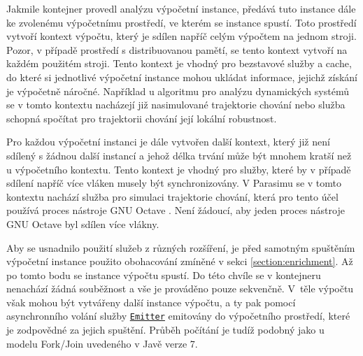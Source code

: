 Jakmile kontejner provedl analýzu výpočetní instance, předává tuto instance dále
ke zvolenému výpočetnímu prostředí, ve kterém se instance spustí. Toto prostředí
vytvoří kontext výpočtu, který je sdílen napříč celým výpočtem na
jednom stroji. Pozor, v případě prostředí s distribuovanou pamětí, se tento kontext
vytvoří na každém použitém stroji. Tento kontext je vhodný pro bezstavové služby
a cache, do které si jednotlivé výpočetní instance mohou ukládat informace, jejichž
získání je vý\-po\-čet\-ně náročné. Například u algoritmu pro analýzu dynamických systémů
se v tomto kontextu nacházejí již nasimulované trajektorie chování nebo služba schopná spočítat
pro trajektorii chování její lokální robustnost.

Pro každou výpočetní instanci je dále vytvořen další kontext, který již není sdílený
s žádnou další instancí a jehož délka trvání může být  mnohem kratší než u výpočetního kontextu.
Tento kontext je vhodný pro služby, které by v případě sdílení napříč více vláken musely
být synchronizovány. V Parasimu se v tomto kontextu nachází služba pro simulaci trajektorie
chování, která pro tento účel používá proces nástroje GNU Octave \cite{eaton2008}. Není
žádoucí, aby jeden proces nástroje GNU Octave byl sdílen více vlákny. 

Aby se usnadnilo použití služeb z různých rozšíření, je před samotným spuštěním výpočetní
instance použito obohacování zmíněné v sekci \ref{section:enrichment}. Až po tomto bodu
se instance výpočtu spustí. Do této chvíle se v kontejneru nenachází žádná souběžnost
a vše je prováděno pouze sekvenčně. V~těle výpočtu však mohou být vytvářeny další instance výpočtu,
a ty pak pomocí asynchronního volání služby \href{https://github.com/sybila/parasim/blob/2.0.0.Final/extensions/computation-lifecycle-api/src/main/java/org/sybila/parasim/computation/lifecycle/api/Emitter.java}{\texttt{Emitter}} emitovány do výpočetního prostředí, které je zodpovědné za jejich spuštění.
Průběh počítání je tudíž podobný jako u modelu Fork/Join \cite{lea2000} uvedeného v Javě verze 7.

